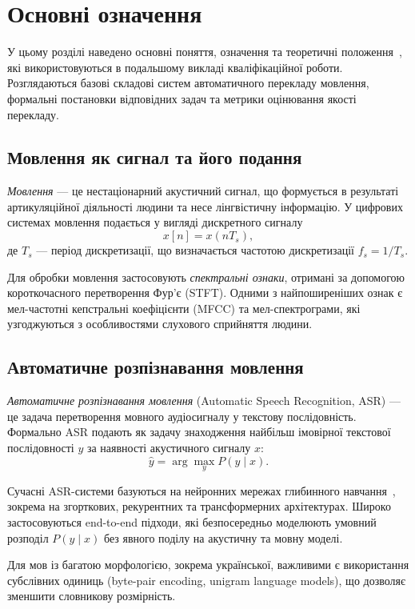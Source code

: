 \section{Основні означення}

У цьому розділі наведено основні поняття, означення та теоретичні
положення~\cite{jurafsky}, які використовуються в подальшому викладі
кваліфікаційної роботи. Розглядаються
базові складові систем автоматичного перекладу мовлення, формальні постановки
відповідних задач та метрики оцінювання якості перекладу.

\subsection{Мовлення як сигнал та його подання}

\textit{Мовлення} --- це нестаціонарний акустичний сигнал, що формується в результаті
артикуляційної діяльності людини та несе лінгвістичну інформацію. У цифрових
системах мовлення подається у вигляді дискретного сигналу
\[
x[n] = x(nT_s),
\]
де $T_s$ --- період дискретизації, що визначається частотою дискретизації
$f_s = 1/T_s$.

Для обробки мовлення застосовують \textit{спектральні ознаки}, отримані за допомогою
короткочасного перетворення Фур'є (STFT). Одними з найпоширеніших ознак є
мел-частотні кепстральні коефіцієнти (MFCC) та мел-спектрограми, які
узгоджуються з особливостями слухового сприйняття людини.

\subsection{Автоматичне розпізнавання мовлення}
\label{subsec:asr}

\textit{Автоматичне розпізнавання мовлення} (Automatic Speech Recognition, ASR) ---
це задача перетворення мовного аудіосигналу у текстову послідовність. Формально
ASR подають як задачу знаходження найбільш імовірної текстової послідовності
$y$ за наявності акустичного сигналу $x$:
\[
\hat{y} = \arg\max_{y} P(y \mid x).
\]

Сучасні ASR-системи базуються на нейронних мережах глибинного
навчання~\cite{asr_survey,goodfellow_dl}, зокрема на згорткових,
рекурентних та трансформерних архітектурах. Широко
застосовуються end-to-end підходи, які безпосередньо моделюють умовний розподіл
$P(y \mid x)$ без явного поділу на акустичну та мовну моделі.

Для мов із багатою морфологією, зокрема української, важливими є використання
субслівних одиниць (byte-pair encoding, unigram language models), що дозволяє
зменшити словникову розмірність.

